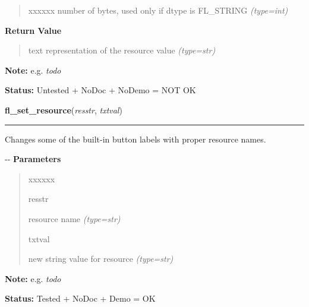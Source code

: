 \begin{boxedminipage}{\funcwidth}
\begin{quote}
\begin{Ventry}{xxxxxx}
number of bytes, used only if dtype is FL\_STRING
            {\it (type=int)}

        \end{Ventry}

      \end{quote}

      \textbf{Return Value}
    \vspace{-1ex}

      \begin{quote}

text representation of the resource value
      {\it (type=str)}

      \end{quote}

\textbf{Note:} 
e.g. \emph{todo}


\textbf{Status:} 
Untested + NoDoc + NoDemo = NOT OK


    \end{boxedminipage}

    \label{xformslib:flxbasic:fl_set_resource}

    \vspace{0.5ex}

\hspace{.8\funcindent}\begin{boxedminipage}{\funcwidth}

    \raggedright \textbf{fl\_set\_resource}(\textit{resstr}, \textit{txtval})

    \vspace{-1.5ex}

    \rule{\textwidth}{0.5\fboxrule}
\setlength{\parskip}{2ex}

Changes some of the built-in button labels with proper resource names.

-{}-
\setlength{\parskip}{1ex}
      \textbf{Parameters}
      \vspace{-1ex}

      \begin{quote}
        \begin{Ventry}{xxxxxx}

          \item[resstr]


resource name
            {\it (type=str)}

          \item[txtval]


new string value for resource
            {\it (type=str)}

        \end{Ventry}

      \end{quote}

\textbf{Note:} 
e.g. \emph{todo}


\textbf{Status:} 
Tested + NoDoc + Demo = OK


    \end{boxedminipage}

